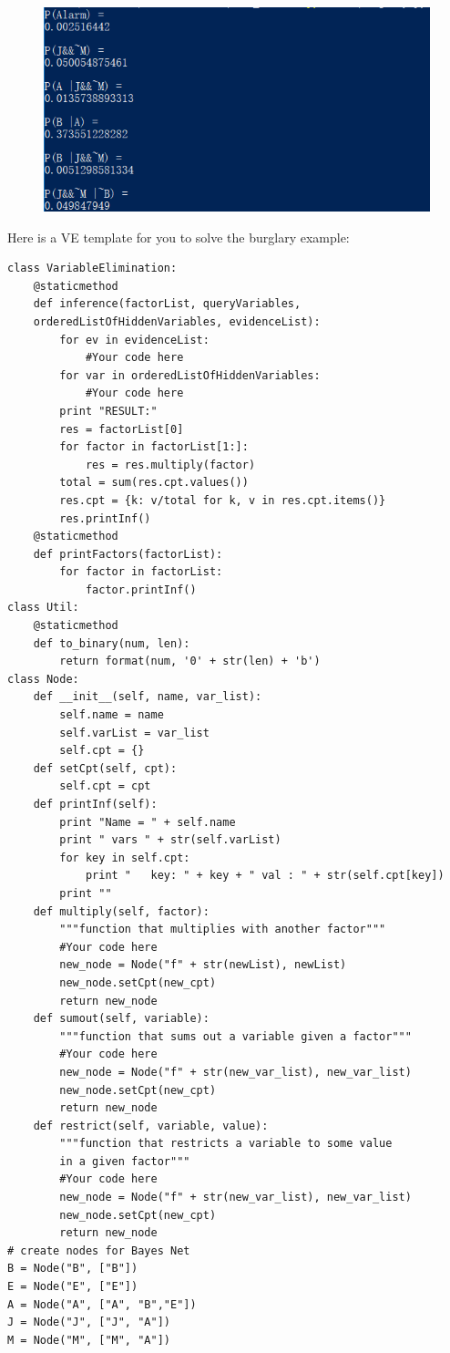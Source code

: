 \documentclass[a4paper, 11pt]{article}
\begin{document}
\begin{figure}[ht]
\centering
\includegraphics[width=12cm]{fig/burglar_result}
\end{figure}
Here is a VE template for you to solve the burglary example:
\begin{lstlisting}
class VariableElimination:
    @staticmethod
    def inference(factorList, queryVariables,
    orderedListOfHiddenVariables, evidenceList):
        for ev in evidenceList:
            #Your code here
        for var in orderedListOfHiddenVariables:
            #Your code here
        print "RESULT:"
        res = factorList[0]
        for factor in factorList[1:]:
            res = res.multiply(factor)
        total = sum(res.cpt.values())
        res.cpt = {k: v/total for k, v in res.cpt.items()}
        res.printInf()
    @staticmethod
    def printFactors(factorList):
        for factor in factorList:
            factor.printInf()
class Util:
    @staticmethod
    def to_binary(num, len):
        return format(num, '0' + str(len) + 'b')
class Node:
    def __init__(self, name, var_list):
        self.name = name
        self.varList = var_list
        self.cpt = {}
    def setCpt(self, cpt):
        self.cpt = cpt
    def printInf(self):
        print "Name = " + self.name
        print " vars " + str(self.varList)
        for key in self.cpt:
            print "   key: " + key + " val : " + str(self.cpt[key])
        print ""
    def multiply(self, factor):
        """function that multiplies with another factor"""
        #Your code here
        new_node = Node("f" + str(newList), newList)
        new_node.setCpt(new_cpt)
        return new_node
    def sumout(self, variable):
        """function that sums out a variable given a factor"""
        #Your code here
        new_node = Node("f" + str(new_var_list), new_var_list)
        new_node.setCpt(new_cpt)
        return new_node
    def restrict(self, variable, value):
        """function that restricts a variable to some value
        in a given factor"""
        #Your code here
        new_node = Node("f" + str(new_var_list), new_var_list)
        new_node.setCpt(new_cpt)
        return new_node
# create nodes for Bayes Net
B = Node("B", ["B"])
E = Node("E", ["E"])
A = Node("A", ["A", "B","E"])
J = Node("J", ["J", "A"])
M = Node("M", ["M", "A"])


\end{lstlisting}
\end{document}
